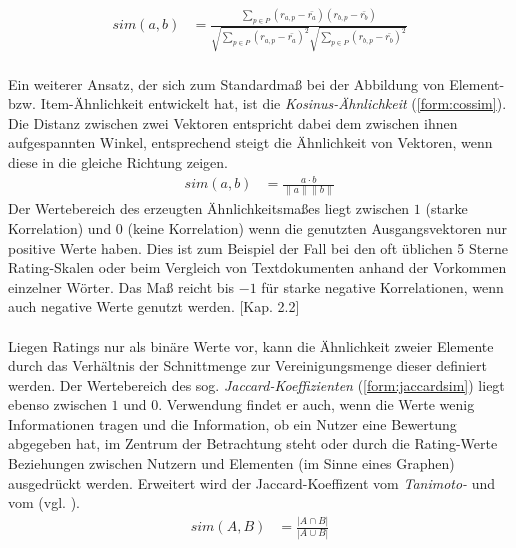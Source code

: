\begin{align}
\label{form:pearsonsim}
sim(a,b) & = \frac{\sum_{p \in P} (r_{a,p}-\bar{r_a})(r_{b,p}-\bar{r_b})}{\sqrt{\sum_{p \in P} (r_{a,p}-\bar{r_a})^2 }\sqrt{\sum_{p \in P} (r_{b,p}-\bar{r_b})^2 }}
\end{align}

\paragraph{}\label{sec:cossim} Ein weiterer Ansatz, der sich zum Standardmaß bei der Abbildung von Element- bzw. Item-Ähnlichkeit entwickelt hat, ist die \textit{Kosinus-Ähnlichkeit} (\ref{form:cossim}). Die Distanz zwischen zwei Vektoren entspricht dabei dem zwischen ihnen aufgespannten Winkel, entsprechend steigt die Ähnlichkeit von Vektoren, wenn diese in die gleiche Richtung zeigen. 
\begin{align}
\label{form:cossim}
sim(a,b) & = \frac{a \cdot b}{\|a\| \|b\|}
\end{align}
Der Wertebereich des erzeugten Ähnlichkeitsmaßes liegt zwischen $1$ (starke Korrelation) und $0$ (keine Korrelation) wenn die genutzten Ausgangsvektoren nur positive Werte haben. Dies ist zum Beispiel der Fall bei den oft üblichen 5 Sterne Rating-Skalen oder beim Vergleich von Textdokumenten anhand der Vorkommen einzelner Wörter. Das Maß reicht bis $-1$ für starke negative Korrelationen, wenn auch negative Werte genutzt werden. \citep{rs}[Kap. 2.2]

\paragraph{} Liegen Ratings nur als binäre Werte vor, kann die Ähnlichkeit zweier Elemente durch das Verhältnis der Schnittmenge zur Vereinigungsmenge dieser definiert werden. Der Wertebereich des sog. \textit{Jaccard-Koeffizienten} (\ref{form:jaccardsim}) liegt ebenso zwischen $1$ und $0$. Verwendung findet er auch, wenn die Werte wenig Informationen tragen und die Information, ob ein Nutzer eine Bewertung abgegeben hat, im Zentrum der Betrachtung steht oder durch die Rating-Werte Beziehungen zwischen Nutzern und Elementen (im Sinne eines Graphen) ausgedrückt werden. Erweitert wird der Jaccard-Koeffizent vom \textit{Tanimoto-} und vom \textit{} (vgl. \citep{bogers09}). \citep[Kap. 3.1]{rs} \citep{pci}
\begin{align}
\label{form:jaccardsim}
sim(A,B) & = \frac{|A \cap B|}{|A \cup B|}
\end{align}

